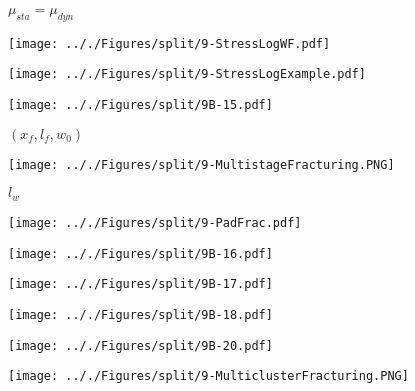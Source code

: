 \documentclass[onecolumn,11pt]{report}
\def\lthtmlcheckvsize{\ifdim\ht\sizebox<\vsize 
  \ifdim\wd\sizebox<\hsize\expandafter\hfill\fi \expandafter\vfill
  \else\expandafter\vss\fi}%
\begin{document}
{\newpage\clearpage
{}%
$ \mu_{sta}=\mu_{dyn}$%
\lthtmlindisplaymathZ
\lthtmlcheckvsize\clearpage}

{\newpage\clearpage
{}%
\texttt{[image: .././Figures/split/9-StressLogWF.pdf]}%
\lthtmlpictureZ
\lthtmlcheckvsize\clearpage}

{\newpage\clearpage
{}%
\texttt{[image: .././Figures/split/9-StressLogExample.pdf]}%
\lthtmlpictureZ
\lthtmlcheckvsize\clearpage}

{\newpage\clearpage
{}%
\texttt{[image: .././Figures/split/9B-15.pdf]}%
\lthtmlpictureZ
\lthtmlcheckvsize\clearpage}

{\newpage\clearpage
{}%
$ (x_f, l_f, w_0)$%
\lthtmlindisplaymathZ
\lthtmlcheckvsize\clearpage}

{\newpage\clearpage
{}%
\texttt{[image: .././Figures/split/9-MultistageFracturing.PNG]}%
\lthtmlpictureZ
\lthtmlcheckvsize\clearpage}

{\newpage\clearpage
{}%
$ l_w$%
\lthtmlindisplaymathZ
\lthtmlcheckvsize\clearpage}

{\newpage\clearpage
{}%
\texttt{[image: .././Figures/split/9-PadFrac.pdf]}%
\lthtmlpictureZ
\lthtmlcheckvsize\clearpage}

{\newpage\clearpage
{}%
\texttt{[image: .././Figures/split/9B-16.pdf]}%
\lthtmlpictureZ
\lthtmlcheckvsize\clearpage}

{\newpage\clearpage
{}%
\texttt{[image: .././Figures/split/9B-17.pdf]}%
\lthtmlpictureZ
\lthtmlcheckvsize\clearpage}

{\newpage\clearpage
{}%
\texttt{[image: .././Figures/split/9B-18.pdf]}%
\lthtmlpictureZ
\lthtmlcheckvsize\clearpage}

{\newpage\clearpage
{}%
\texttt{[image: .././Figures/split/9B-20.pdf]}%
\lthtmlpictureZ
\lthtmlcheckvsize\clearpage}

{\newpage\clearpage
{}%
\texttt{[image: .././Figures/split/9-MulticlusterFracturing.PNG]}%
\lthtmlpictureZ
\lthtmlcheckvsize\clearpage}
\end{document}
